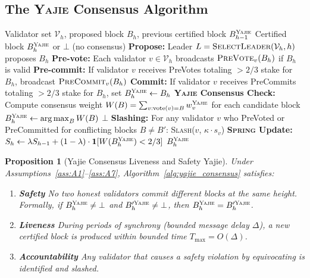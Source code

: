 \documentclass[11pt,a4paper]{article}
\newtheorem{proposition}[theorem]{Proposition}
\theoremstyle{definition}
\newcommand{\Yajie}{\textsc{Yajie}}
\newcommand{\Spring}{\textsc{Spring}}
\DeclareMathOperator*{\argmax}{arg\,max}
\newcommand{\ind}[1]{\mathbf{1}[#1]}
\newcommand{\validatorSet}{\mathcal{V}}
\begin{document}
\subsection{The \Yajie{} Consensus Algorithm}
\begin{algorithm}[htbp]
\caption{\Yajie{} Multi-Validator Blockchain Consensus}
\label{alg:yajie_consensus}
\begin{algorithmic}[1]
\Require Validator set $\validatorSet_h$, proposed block $B_h$, previous certified block $B_{h-1}^{\Yajie}$
\Ensure Certified block $B_h^{\Yajie}$ or $\bot$ (no consensus)
\State \textbf{Propose:} Leader $L = \textsc{SelectLeader}(\validatorSet_h, h)$ proposes $B_h$
\State \textbf{Pre-vote:} Each validator $v \in \validatorSet_h$ broadcasts $\textsc{PreVote}_v(B_h)$ if $B_h$ is valid
\State \textbf{Pre-commit:} If validator $v$ receives PreVotes totaling $>2/3$ stake for $B_h$, broadcast $\textsc{PreCommit}_v(B_h)$
\State \textbf{Commit:} If validator $v$ receives PreCommits totaling $>2/3$ stake for $B_h$, set $B_h^{\Yajie} \gets B_h$
\State \textbf{\Yajie{} Consensus Check:}
\State \quad Compute consensus weight $W(B) = \sum_{v: \text{vote}(v) = B} w_v^{\Yajie}$ for each candidate block
\State \quad $B_h^{\Yajie} \gets \argmax_B W(B)$
\State \quad \If{$W(B_h^{\Yajie}) < 2/3 \cdot \sum_v w_v^{\Yajie}$}
\State \quad \quad \Return $\bot$ 
\State \quad \EndIf
\State \textbf{Slashing:} For any validator $v$ who PreVoted or PreCommitted for conflicting blocks $B \neq B'$:
\State \quad \textsc{Slash}($v$, $\kappa \cdot s_v$) 
\State \textbf{\Spring{} Update:} $S_h \gets \lambda S_{h-1} + (1-\lambda) \cdot \ind{W(B_h^{\Yajie}) < 2/3}$
\State \Return $B_h^{\Yajie}$
\end{algorithmic}
\end{algorithm}
\begin{proposition}[Yajie Consensus Liveness and Safety Yajie]
\label{prop:yajie_liveness_safety}
Under Assumptions~\ref{ass:A1}--\ref{ass:A7}, Algorithm~\ref{alg:yajie_consensus} satisfies:
\begin{enumerate}[label=(\roman*)]
    \item \textbf{Safety} No two honest validators commit different blocks at the same height. Formally, if $B_h^{\Yajie} \neq \bot$ and $B_h'^{\Yajie} \neq \bot$, then $B_h^{\Yajie} = B_h'^{\Yajie}$.
    \item \textbf{Liveness} During periods of synchrony (bounded message delay $\Delta$), a new certified block is produced within bounded time $T_{\max} = O(\Delta)$.
    \item \textbf{Accountability} Any validator that causes a safety violation by equivocating is identified and slashed.
\end{enumerate}
\end{proposition}
\end{document}
